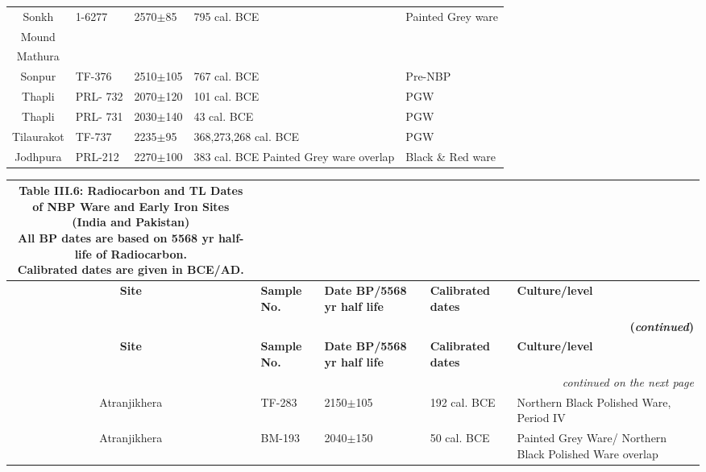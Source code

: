 {{\begin{longtable}{|c|p{1.4cm}|p{1cm}|p{1.5cm}|p{3cm}|}
Sonkh & 1-6277 & 2570$\pm$85 & 795 cal. BCE &Painted Grey ware\\
Mound & & & & \\
Mathura & & & & \\
Sonpur & TF-376 & 2510$\pm$105 & 767 cal. BCE &Pre-NBP\\
Thapli & PRL- 732 & 2070$\pm$120 & 101 cal. BCE & PGW\\
Thapli & PRL- 731 & 2030$\pm$140 & 43 cal. BCE &PGW\\
Tilaurakot & TF-737 & 2235$\pm$95 & 368,273,268 cal. BCE &PGW\\
Jodhpura & PRL-212 & 2270$\pm$100 & 383 cal. BCE Painted Grey ware overlap & Black \& Red ware
\end{longtable}
}}

{\setlength\tabcolsep{2pt}
{\fontsize{8}{10}\selectfont
\begin{longtable}{|c|p{1.1cm}|p{1.2cm}|p{1.8cm}|p{3.3cm}|}
\caption*{{\fontsize{9}{11}\selectfont  Table III.6: Radiocarbon and TL Dates of NBP Ware and Early Iron Sites\\
(India and Pakistan)\\ [5pt]
All BP dates are based on 5568 yr half-life of Radiocarbon. \\[-3pt] 
Calibrated dates are given in BCE/AD.}\label{table III.6}}\\
\hline
\multicolumn{1}{|m{1.3cm}|}{\centering \textbf{Site}} &\multicolumn{1}{m{1.1cm}|}{\centering \textbf{Sample No.}}&\multicolumn{1}{m{1.2cm}|}{\centering \textbf{Date BP/5568 yr half life}}& \multicolumn{1}{m{1.8cm}|}{\centering \textbf{Calibrated dates}}& \multicolumn{1}{m{3.3cm}|}{\centering \textbf{Culture/level}}\\
\endfirsthead
\multicolumn{5}{r}{\textbf{(\textit{continued})}}\\[5pt]
\hline
\multicolumn{1}{|m{1.3cm}|}{\centering \textbf{Site}} &\multicolumn{1}{m{1.1cm}|}{\centering \textbf{Sample No.}}&\multicolumn{1}{m{1.2cm}|}{\centering \textbf{Date BP/5568 yr half life}}& \multicolumn{1}{m{1.8cm}|}{\centering \textbf{Calibrated dates}}& \multicolumn{1}{m{3.3cm}|}{\centering \textbf{Culture/level}}\\
\hline
\endhead
\hline
\multicolumn{5}{r}{\small\itshape continued on the next page}\\
\endfoot
\endlastfoot
\hline
Atranjikhera & TF-283 & 2150$\pm$105 & 192 cal. BCE &Northern Black Polished Ware, Period IV\\
Atranjikhera & BM-193 & 2040$\pm$150 & 50 cal. BCE & Painted Grey Ware/ Northern Black Polished Ware overlap\\

\end{longtable}}}
